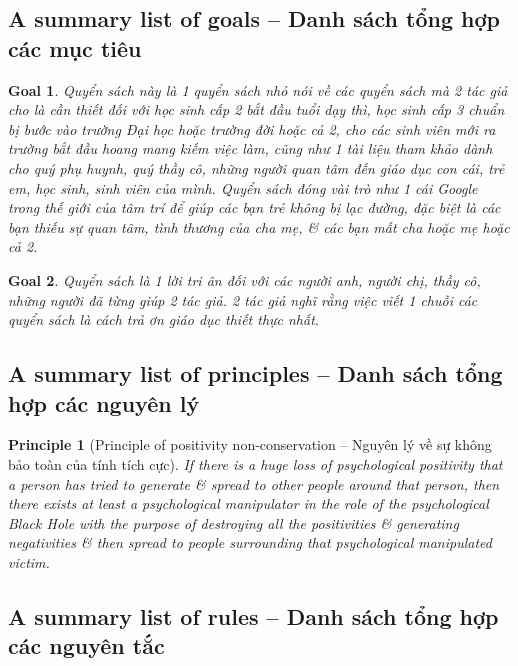 \documentclass[12pt]{article}
\newtheorem{goal}{Goal}
\newtheorem{principle}{Principle}
\begin{document}
\subsection{A summary list of goals -- Danh sách tổng hợp các mục tiêu}

\begin{goal}
	Quyển sách này là 1 quyển sách nhỏ nói về các quyển sách mà 2 tác giả cho là cần thiết đối với học sinh cấp 2 bắt đầu tuổi dạy thì, học sinh cấp 3 chuẩn bị bước vào trường Đại học hoặc trường đời hoặc cả 2, cho các sinh viên mới ra trường bắt đầu hoang mang kiếm việc làm, cũng như 1 tài liệu tham khảo dành cho quý phụ huynh, quý thầy cô, những người quan tâm đến giáo dục con cái, trẻ em, học sinh, sinh viên của mình. Quyển sách đóng vài trò như 1 cái Google trong thế giới của tâm trí để giúp các bạn trẻ không bị lạc đường, đặc biệt là các bạn thiếu sự quan tâm, tình thương của cha mẹ, \& các bạn mất cha hoặc mẹ hoặc cả 2.
\end{goal}

\begin{goal}
	Quyển sách là 1 lời tri ân đối với các người anh, người chị, thầy cô, những người đã từng giúp 2 tác giả. 2 tác giả nghĩ rằng việc viết 1 chuỗi các quyển sách là cách trả ơn giáo dục thiết thực nhất.
\end{goal}

\subsection{A summary list of principles -- Danh sách tổng hợp các nguyên lý}

\begin{principle}[Principle of positivity non-conservation -- Nguyên lý về sự không bảo toàn của tính tích cực]
	If there is a huge loss of psychological positivity that a person has tried to generate \& spread to other people around that person, then there exists at least a psychological manipulator in the role of the psychological Black Hole with the purpose of destroying all the positivities \& generating negativities \& then spread to people surrounding that psychological manipulated victim.
\end{principle}

\subsection{A summary list of rules -- Danh sách tổng hợp các nguyên tắc}
\end{document}
